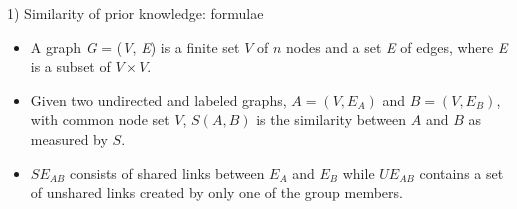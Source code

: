     
    




\begin{frame}{1) Similarity of prior knowledge: formulae}
    \begin{itemize}
        \item A graph \textit{G} = (\textit{V}, \textit{E}) is a finite set $V$ 
        of $n$ nodes and a set \textit{E} of edges, where \textit{E} is a 
        subset of $V \times V$.
        \item Given two undirected and labeled graphs, $A = (V, E_A)$ and 
        $B = (V, E_B)$, with common node set $V$, $S(A, B)$ is the similarity 
        between $A$ and $B$ as measured by $S$. 
        \item $SE_{AB}$ consists of shared links between $E_A$ and $E_B$ 
        while $UE_{AB}$ contains a set of unshared links created by 
        only one of the group members.
    \end{itemize}
\end{frame}

